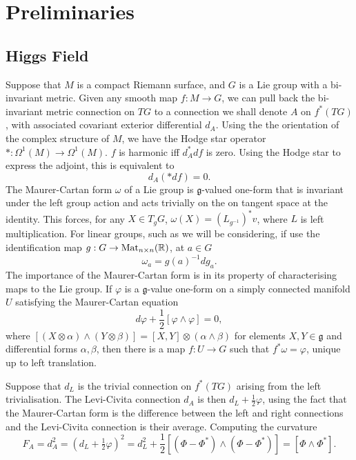 
\section{Preliminaries}
\label{sec:Preliminaries}

\notoc\subsection{Higgs Field}

Suppose that $M$ is a compact Riemann surface, and $G$ is a Lie group with a bi-invariant metric. Given any smooth map $f: M\to G$, we can pull back the bi-invariant metric connection on $TG$ to a connection we shall denote $A$ on $f^*(TG)$, with associated covariant exterior differential $d_A$. Using the the orientation of the complex structure of $M$, we have the Hodge star operator $* : Ω^1(M) \to Ω^1(M)$. $f$ is harmonic iff $d_A^* df$ is zero. Using the Hodge star to express the adjoint, this is equivalent to
\[
d_A (* df) = 0.
\]
The Maurer-Cartan form $ω$ of a Lie group is $\mathfrak{g}$-valued one-form that is invariant under the left group action and acts trivially on the on tangent space at the identity. This forces, for any $X\in T_gG$, $ω(X) = (L_{g^{-1}})^*v$, where $L$ is left multiplication. For linear groups, such as we will be considering, if use the identification map $g:G \to \operatorname{Mat}_{n\times n}(\mathbb{R})$, at $a\in G$
\[
ω_a = g(a)^{-1} dg_a.
\]
The importance of the Maurer-Cartan form is in its property of characterising maps to the Lie group. If $φ$ is a $\mathfrak{g}$-value one-form on a simply connected manifold $U$ satisfying the Maurer-Cartan equation
\[
dφ + \frac{1}{2}[φ\wedge φ] = 0,
\]
where $[(X\otimes α) \wedge (Y\otimes β)] = [X,Y]\otimes(α\wedge β)$ for elements $X,Y\in\mathfrak{g}$ and differential forms $α,β$, then there is a map $f:U \to G$ such that $f^*ω = φ$, unique up to left translation.

Suppose that $d_L$ is the trivial connection on $f^*(TG)$ arising from the left trivialisation. The Levi-Civita connection $d_A$ is then $d_L + \tfrac{1}{2}φ$, using the fact that the Maurer-Cartan form is the difference between the left and right connections and the Levi-Civita connection is their average. Computing the curvature
\[
F_A = d_A^2
= (d_L + \tfrac{1}{2}φ)^2
= d_L^2 + \frac{1}{2}[(Φ - Φ^*) \wedge (Φ - Φ^*)]
= [Φ \wedge Φ^*].
\]

